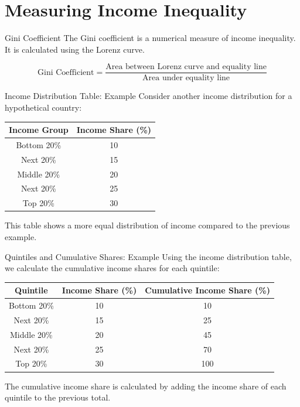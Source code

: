 \documentclass{beamer}
\begin{document}
\section{Measuring Income Inequality}

\begin{frame}{Gini Coefficient}
The Gini coefficient is a numerical measure of income inequality. It is calculated using the Lorenz curve.

\[
\text{Gini Coefficient} = \frac{\text{Area between Lorenz curve and equality line}}{\text{Area under equality line}}
\]
\end{frame}



\begin{frame}{Income Distribution Table: Example }
Consider another income distribution for a hypothetical country:
\begin{table}[h]
\centering
\begin{tabular}{|c|c|}
\hline
\textbf{Income Group} & \textbf{Income Share (\%)} \\
\hline
Bottom 20\% & 10 \\
Next 20\% & 15 \\
Middle 20\% & 20 \\
Next 20\% & 25 \\
Top 20\% & 30 \\
\hline
\end{tabular}
\end{table}

This table shows a more equal distribution of income compared to the previous example.
\end{frame}

\begin{frame}{Quintiles and Cumulative Shares: Example }
Using the income distribution table, we calculate the cumulative income shares for each quintile:
\begin{table}[h]
\centering
\begin{tabular}{|c|c|c|}
\hline
\textbf{Quintile} & \textbf{Income Share (\%)} & \textbf{Cumulative Income Share (\%)} \\
\hline
Bottom 20\% & 10 & 10 \\
Next 20\% & 15 & 25 \\
Middle 20\% & 20 & 45 \\
Next 20\% & 25 & 70 \\
Top 20\% & 30 & 100 \\
\hline
\end{tabular}
\end{table}

The cumulative income share is calculated by adding the income share of each quintile to the previous total.
\end{frame}
\end{document}
